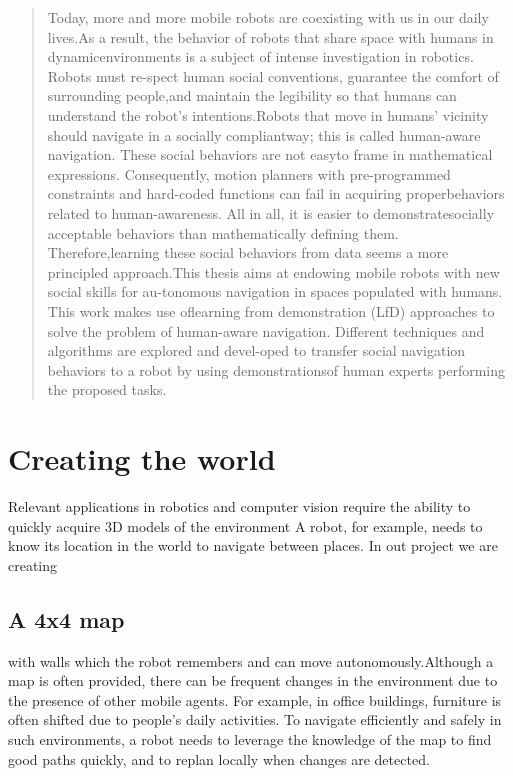 \documentclass{ndjflart}
\theoremstyle{definition}
\theoremstyle{remark}
\begin{document}
\begin{frontmatter}


\begin{abstract}
  Today, more and more mobile robots are coexisting with us in our daily lives.As  a  result,  the  behavior of  robots  that  share  space  with  humans  in  dynamicenvironments is a subject of intense investigation in robotics.  Robots must re-spect human social conventions,  guarantee the comfort of surrounding people,and maintain the legibility so that humans can understand the robot’s intentions.Robots that move in humans’ vicinity should navigate in a socially compliantway; this is called human-aware navigation.  These social behaviors are not easyto frame in mathematical expressions. Consequently, motion planners with pre-programmed constraints and hard-coded functions can fail in acquiring properbehaviors  related  to  human-awareness.   All  in  all,  it  is  easier  to  demonstratesocially  acceptable  behaviors  than  mathematically  defining  them.   Therefore,learning these social behaviors from data seems a more principled approach.This  thesis  aims  at  endowing  mobile  robots  with  new  social  skills  for  au-tonomous navigation in spaces populated with humans.  This work makes use oflearning from demonstration (LfD) approaches to solve the problem of human-aware navigation.  Different techniques and algorithms are explored and devel-oped to transfer social navigation behaviors to a robot by using demonstrationsof human experts performing the proposed tasks.
\end{abstract}

\end{frontmatter}


\section{Creating the world}\label{intro}
Relevant applications in robotics and computer vision require
the ability to quickly acquire 3D models of the
environment  A robot, for example, needs to know its location
in the world to navigate between places. In out project we are creating

\subsection{A
4x4 map}\label{fonts} with walls which the robot remembers and can move autonomously.Although a map is often provided, there can be frequent changes in the environment due to the presence of other mobile agents. For example, in office buildings, furniture is often shifted due to people’s daily activities. To navigate efficiently and safely in such environments, a robot needs to leverage the knowledge of the map to find good paths quickly, and to replan locally when changes are detected.
\end{document}
